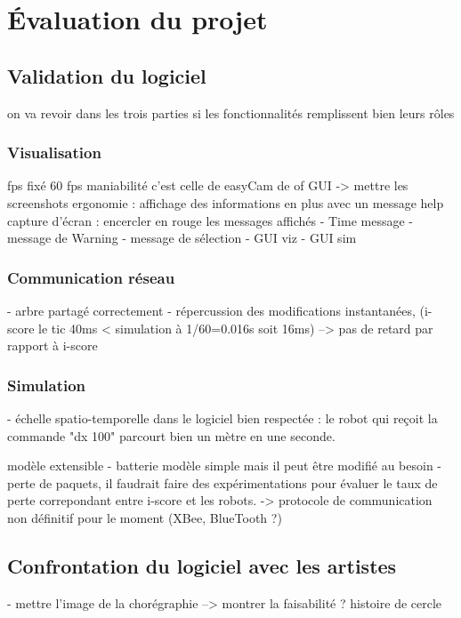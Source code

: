 \section{Évaluation du projet}
\subsection{Validation du logiciel} %
on va revoir dans les trois parties si les fonctionnalités remplissent bien leurs rôles
\subsubsection{Visualisation}
fps fixé 60 fps
maniabilité c'est celle de easyCam de of
GUI -> mettre les screenshots
ergonomie : affichage des informations en plus avec un message help
capture d'écran : encercler en rouge les messages affichés
- Time message
- message de Warning
- message de sélection
- GUI viz
- GUI sim



\subsubsection{Communication réseau}

- arbre partagé correctement
- répercussion des modifications instantanées, (i-score le tic 40ms < simulation à 1/60=0.016s soit 16ms)
--> pas de retard par rapport à i-score

\subsubsection{Simulation}

- échelle spatio-temporelle dans le logiciel bien respectée : le robot qui reçoit la commande "dx 100" parcourt bien un mètre en une seconde.

modèle extensible
- batterie modèle simple mais il peut être modifié au besoin
- perte de paquets, il faudrait faire des expérimentations pour évaluer le taux de perte correpondant entre i-score et les robots. -> protocole de communication non définitif pour le moment (XBee, BlueTooth ?)

\subsection{Confrontation du logiciel avec les artistes}

- mettre l'image de la chorégraphie
--> montrer la faisabilité ? histoire de cercle 

